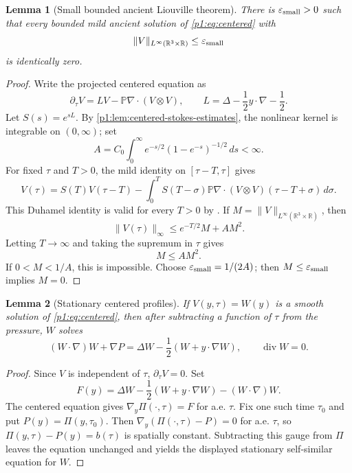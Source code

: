 \documentclass[11pt]{amsart}
\theoremstyle{plain}
\newtheorem{lemma}[lemma]{Lemma}
\theoremstyle{definition}
\theoremstyle{remark}
\numberwithin{equation}{section}
\newcommand{\R}{\mathbb R}
\newcommand{\divergence}{\operatorname{div}}
\begin{document}
\begin{lemma}[Small bounded ancient Liouville theorem]\label{p1:lem:small-liouville}
There is \(\varepsilon_{\rm small}>0\) such that every bounded mild ancient solution of
\eqref{p1:eq:centered} with
\[
   \|V\|_{L^\infty(\R^3\times\R)}\le\varepsilon_{\rm small}
\]
is identically zero.
\end{lemma}

\begin{proof}
Write the projected centered equation as
\[
   \partial_\tau V=LV-\mathbb P\nabla\cdot(V\otimes V),
   \qquad
   L=\Delta-\frac12 y\cdot\nabla-\frac12.
\]
Let \(S(s)=e^{sL}\).  By \cref{p1:lem:centered-stokes-estimates}, the nonlinear
kernel is integrable on \((0,\infty)\); set
\[
   A=C_0\int_0^\infty e^{-s/2}(1-e^{-s})^{-1/2}\,ds<\infty .
\]
For fixed \(\tau\) and \(T>0\), the mild identity on \([\tau-T,\tau]\) gives
\[
   V(\tau)
   =
   S(T)V(\tau-T)
   -
   \int_0^T
   S(T-\sigma)\mathbb P\nabla\cdot(V\otimes V)(\tau-T+\sigma)\,d\sigma .
\]
This Duhamel identity is valid for every \(T>0\) by
.
If \(M=\|V\|_{L^\infty(\R^3\times\R)}\), then
\[
   \|V(\tau)\|_\infty\le e^{-T/2}M+AM^2.
\]
Letting \(T\to\infty\) and taking the supremum in \(\tau\) gives
\[
   M\le AM^2.
\]
If \(0<M<1/A\), this is impossible.  Choose
\(\varepsilon_{\rm small}=1/(2A)\); then
\(M\le\varepsilon_{\rm small}\) implies \(M=0\).
\end{proof}

\begin{lemma}[Stationary centered profiles]\label{p1:lem:stationary-profile}
If \(V(y,\tau)=W(y)\) is a smooth solution of \eqref{p1:eq:centered}, then after
subtracting a function of \(\tau\) from the pressure, \(W\) solves
\[
   (W\cdot\nabla)W+\nabla P
   =
   \Delta W-\frac12(W+y\cdot\nabla W),
   \qquad \divergence W=0.
\]
\end{lemma}

\begin{proof}
Since \(V\) is independent of \(\tau\), \(\partial_\tau V=0\).  Set
\[
   F(y)=
   \Delta W-\frac12(W+y\cdot\nabla W)-(W\cdot\nabla)W .
\]
The centered equation gives \(\nabla_y\Pi(\cdot,\tau)=F\) for a.e. \(\tau\).
Fix one such time \(\tau_0\) and put \(P(y)=\Pi(y,\tau_0)\).  Then
\(\nabla_y(\Pi(\cdot,\tau)-P)=0\) for a.e. \(\tau\), so
\(\Pi(y,\tau)-P(y)=b(\tau)\) is spatially constant.  Subtracting this gauge
from \(\Pi\) leaves the equation unchanged and yields the displayed
stationary self-similar equation for \(W\).
\end{proof}
\end{document}
